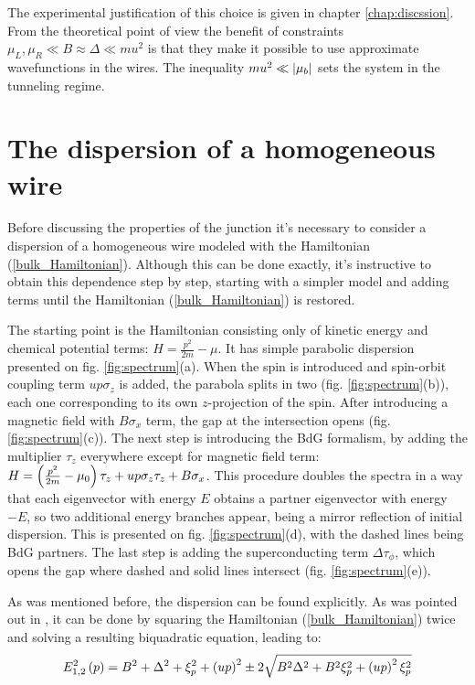  The experimental justification of this choice is given in chapter \ref{chap:discssion}. From the theoretical point of view the benefit of constraints $ \mu_L,\mu_R \ll B \approx \Delta \ll mu^2 $ is that they make it possible to use  approximate wavefunctions in the wires. The inequality $ mu^2\ll \left|\mu_b\right|$ sets the system in the tunneling regime.
  


\section{The dispersion of a homogeneous wire}

Before discussing the properties of the junction it's necessary to consider a dispersion of a homogeneous wire modeled with the Hamiltonian (\ref{bulk_Hamiltonian}). Although this can be done exactly, it's instructive to obtain this dependence step by step, starting with a simpler model and adding terms until the Hamiltonian (\ref{bulk_Hamiltonian}) is restored.

The starting point is the Hamiltonian consisting only of kinetic energy and chemical potential terms: $ H =\frac{ p^2}{2m} - \mu$. It has simple parabolic dispersion presented on fig. \ref{fig:spectrum}(a). When the spin is introduced and spin-orbit coupling term $ up\sigma_z $ is added, the parabola splits in two (fig. \ref{fig:spectrum}(b)), each one corresponding to its own $ z $-projection of the spin. After introducing a magnetic field with $ B\sigma_x $ term, the gap at the intersection opens (fig. \ref{fig:spectrum}(c)). The next step is introducing the BdG formalism, by adding the multiplier $ \tau_z $ everywhere except for magnetic field term:  $ 	H = \left(\frac{p^2}{2m} 	-\mu_0 \right)\tau_z +u p \sigma_z \tau_z + B\sigma_x	 $. This procedure doubles the spectra in a way that each eigenvector with energy $ E $ obtains a partner eigenvector with energy $ -E $, so two additional  energy branches appear, being a mirror reflection of  initial dispersion. This is presented on fig. \ref{fig:spectrum}(d), with the dashed lines being BdG partners. The last step is adding the superconducting term $ \Delta\tau_\phi $, which opens the gap where dashed and	 solid lines intersect (fig. \ref{fig:spectrum}(e)).

As was mentioned before, the dispersion can be found explicitly. As was pointed out in \cite{Oreg_2010}, it can be done by squaring the Hamiltonian (\ref{bulk_Hamiltonian}) twice and solving a resulting biquadratic equation, leading to:
\begin{equation}
E^2_{1,2}\left(p\right)
=
B^2
+
\Delta^2
+
\xi_p^2
+
\left(up\right)^2
\pm	
2\sqrt{
	B^2 \Delta^2
	+
	B^2\xi_p^2
	+
	\left(up\right)^2\xi_p^2
}
\end{equation}

